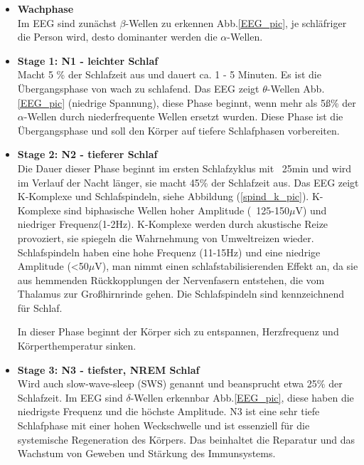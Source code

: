 \documentclass[a4paper, 12pt]{article}
\begin{document}
\begin{itemize}
\item \textbf{Wachphase}\\
Im EEG sind zunächst \(\beta\)-Wellen zu erkennen Abb.\ref{EEG_pic}, je schläfriger die Person wird, desto dominanter werden die \(\alpha\)-Wellen.

\item \textbf{Stage 1: N1 - leichter Schlaf}\\
Macht 5 \% der Schlafzeit aus und dauert ca. 1 - 5 Minuten. Es ist die Übergangsphase von wach zu schlafend. Das EEG zeigt \(\theta \)-Wellen Abb.\ref{EEG_pic} (niedrige Spannung), diese Phase beginnt, wenn mehr als 5ß\% der \(\alpha\)-Wellen durch niederfrequente Wellen ersetzt wurden. Diese Phase ist die Übergangsphase und soll den Körper auf tiefere Schlafphasen vorbereiten.

\item \textbf{Stage 2: N2 - tieferer Schlaf}\\
Die Dauer dieser Phase beginnt im ersten Schlafzyklus mit ~25min und wird im Verlauf der Nacht länger, sie macht 45\% der Schlafzeit aus. Das EEG zeigt K-Komplexe und Schlafspindeln, siehe Abbildung (\ref{spind_k_pic}). K-Komplexe sind biphasische Wellen hoher Amplitude (~125-150\(\mu\)V) und niedriger Frequenz(1-2Hz). K-Komplexe werden durch akustische Reize provoziert, sie spiegeln die Wahrnehmung von Umweltreizen wieder. Schlafspindeln haben eine hohe Frequenz (11-15Hz) und eine niedrige Amplitude (<50\(\mu\)V), man nimmt einen schlafstabilisierenden Effekt an, da sie aus hemmenden Rückkopplungen der Nervenfasern entstehen, die vom Thalamus zur Großhirnrinde gehen. Die Schlafspindeln sind kennzeichnend für Schlaf. \cite{flexikon} \cite{pschyrembel_267}

In dieser Phase beginnt der Körper sich zu entspannen, Herzfrequenz und Körperthemperatur sinken.

\item \textbf{Stage 3: N3 - tiefster, NREM Schlaf}\\
Wird auch slow-wave-sleep (SWS) genannt und beansprucht etwa 25\% der Schlafzeit. Im EEG sind \(\delta\)-Wellen erkennbar Abb.\ref{EEG_pic}, diese haben die niedrigste Frequenz und die höchste Amplitude. N3 ist eine sehr tiefe Schlafphase mit einer hohen Weckschwelle und ist essenziell für die systemische Regeneration des Körpers. Das beinhaltet die Reparatur und das Wachstum von Geweben und Stärkung des Immunsystems.


\end{itemize}
\end{document}
